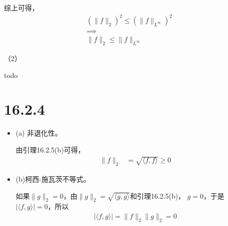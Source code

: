 \documentclass{article}
\begin{document}
综上可得，
\begin{align*}
  (\|f\|_2)^2 \leq (\|f\|_{L^\infty})^2 \\
  \implies                              \\
  \|f\|_2 \leq  \|f\|_{L^\infty}
\end{align*}

（2）

todo

\section*{16.2.4}

\begin{itemize}
  \item (a) 非退化性。

        由引理16.2.5(b)可得，
        \begin{align*}
          \|f\|_2 & = \sqrt{\langle f, f \rangle} \geq 0
        \end{align*}

  \item (b)柯西-施瓦茨不等式。

        如果$\|g\|_2 = 0$，由$\|g\|_2 = \sqrt{\langle g, g \rangle}$和引理16.2.5(b)，
        $g = 0$，于是$|\langle f, g \rangle| = 0$，所以
        \begin{align*}
          |\langle f, g \rangle| = \|f\|_2\|g\|_2 = 0
        \end{align*}


\end{itemize}
\end{document}
